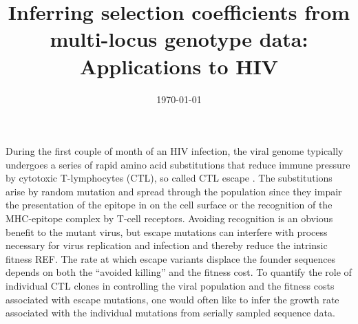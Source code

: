 \documentclass[rmp,twocolumn]{revtex4}
\begin{document}
\title{Inferring selection coefficients from multi-locus genotype data:
Applications to HIV}


\date{\today}

\begin{abstract}

\end{abstract}
\maketitle
During the first couple of month of an HIV infection, the viral genome typically
undergoes a series of rapid amino acid substitutions that reduce immune
pressure by cytotoxic T-lymphocytes (CTL), so called CTL escape
\citep{Mcmichael:2009p31614}. The substitutions arise by random mutation and
spread through the population since they impair the presentation of the epitope
in on the cell surface or the recognition of the MHC-epitope complex by T-cell
receptors. Avoiding recognition is an obvious benefit to the mutant virus, but
escape mutations can interfere with process necessary for virus replication and
infection and thereby reduce the intrinsic fitness REF. The rate at which escape
variants displace the founder sequences depends on both the ``avoided killing''
and the fitness cost. To quantify the role of individual CTL clones in
controlling the viral population and the fitness costs associated with escape
mutations, one would often like to infer the growth rate associated
with the individual mutations from serially sampled sequence data.
\end{document}
